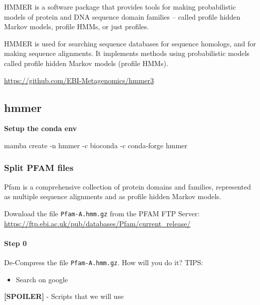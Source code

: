 \documentclass[
]{book}
\newenvironment{Shaded}{\begin{snugshade}}{\end{snugshade}}
\newcommand{\AttributeTok}[1]{\textcolor[rgb]{0.13,0.29,0.53}{#1}}
\newcommand{\ExtensionTok}[1]{#1}
\newcommand{\NormalTok}[1]{#1}
\providecommand{\tightlist}{%
  \setlength{\itemsep}{0pt}\setlength{\parskip}{0pt}}
\begin{document}
HMMER is a software package that provides tools for making probabilistic models of protein and DNA sequence domain families -- called profile hidden Markov models, profile HMMs, or just profiles.

HMMER is used for searching sequence databases for sequence homologs, and for making sequence alignments. It implements methods using probabilistic models called profile hidden Markov models (profile HMMs).

\url{https://github.com/EBI-Metagenomics/hmmer3}

\subsection{hmmer}\label{hmmer}

\textbf{Setup the conda env}

\begin{Shaded}
\begin{Highlighting}[]
\ExtensionTok{mamba}\NormalTok{ create }\AttributeTok{{-}n}\NormalTok{ hmmer }\AttributeTok{{-}c}\NormalTok{ bioconda }\AttributeTok{{-}c}\NormalTok{ conda{-}forge hmmer}
\end{Highlighting}
\end{Shaded}

\subsubsection{Split PFAM files}\label{split-pfam-files}

Pfam is a comprehensive collection of protein domains and families, represented as multiple sequence alignments and as profile hidden Markov models.

Download the file \texttt{Pfam-A.hmm.gz} from the PFAM FTP Server: \url{https://ftp.ebi.ac.uk/pub/databases/Pfam/current_release/}

\paragraph*{\texorpdfstring{\textbf{Step 0}}{Step 0}}\label{step-0}

De-Compress the file \texttt{Pfam-A.hmm.gz}. How will you do it?
TIPS:

\begin{itemize}
\tightlist
\item
  Search on google
\end{itemize}

\textbf{{[}SPOILER{]}} - Scripts that we will use
\end{document}
